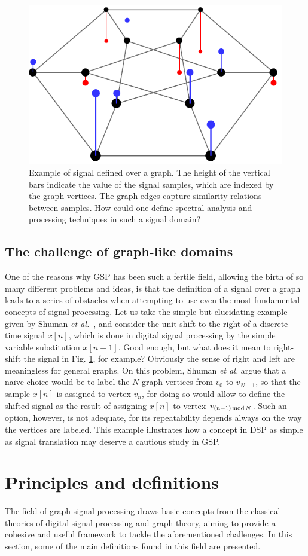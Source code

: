\begin{figure}
	\centering
	\includegraphics[width=0.35\linewidth]{Figures/signal_duher_graph_2.pdf}
	\caption{Example of signal defined over a graph. The height of the vertical bars indicate the value of the signal samples, which are indexed by the graph vertices. The graph edges capture similarity relations between samples. How could one define spectral analysis and processing techniques in such a signal domain?}
	\label{fig:duher}
\end{figure}

\subsection{The challenge of graph-like domains}

One of the reasons why GSP has been such a fertile field, allowing the birth of so many different problems and ideas, is that the definition of a signal over a graph leads to a series of obstacles when attempting to use even the most fundamental concepts of signal processing. Let us take the simple but elucidating example given by Shuman \emph{et al.}~\cite{shuman2013emerging}, and consider the unit shift to the right of a discrete-time signal $ x[n] $, which is done in digital signal processing by the simple variable substitution $ x[n-1] $. Good enough, but what does it mean to right-shift the signal in  Fig. \ref{fig:duher}, for example? Obviously the sense of right and left are meaningless for general graphs. On this problem, Shuman \emph{et al.} argue that a na\"ive choice would be to label the $ N $ graph vertices from $ v_0 $ to $ v_{N-1} $, so that the sample $ x[n] $ is assigned to vertex $ v_n $, for doing so would allow to define the shifted signal as the result of assigning $ x[n] $ to vertex $ v_{(n-1) \text{\,mod\,} N} $. Such an option, however, is not adequate, for its repeatability depends always on the way the vertices are labeled. This example illustrates how a concept in DSP as simple as signal translation may deserve a cautious study in GSP.


\section{Principles and definitions}
\label{sec:II}
The field of graph signal processing draws basic concepts from the classical theories of digital signal processing and graph theory, aiming to provide a cohesive and useful framework to tackle the aforementioned challenges. In this section, some of the main definitions found in this field are presented.


